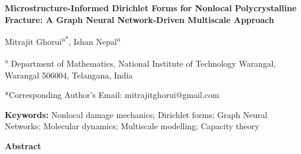 \documentclass[12pt,a4paper]{article}
\newcommand{\NMAMLDTitle}[1]{%
  {\centering\fontsize{14}{16.8}\selectfont\bfseries #1\par}%
}
\newcommand{\NMAMLDAuthors}[1]{%
  {\centering\fontsize{12}{14.4}\selectfont #1\par}%
}
\newcommand{\NMAMLDAffiliation}[2]{%
  {\centering\fontsize{10}{12}\selectfont\textsuperscript{#1} #2\par}%
  \vspace{6pt}
}
\newcommand{\NMAMLDSection}[1]{%
  {\fontsize{12}{14.4}\selectfont\bfseries #1\par}%
}
\begin{document}
\thispagestyle{nmamldfirst}

\NMAMLDTitle{Microstructure-Informed Dirichlet Forms for Nonlocal Polycrystalline Fracture: A Graph Neural Network-Driven Multiscale Approach}

\vspace{4pt}

\NMAMLDAuthors{%
Mitrajit Ghorui\textsuperscript{a*},
Ishan Nepal\textsuperscript{a}
}

\vspace{4pt}

\NMAMLDAffiliation{a}{Department of Mathematics, National Institute of Technology Warangal, Warangal 506004, Telangana, India}

{\fontsize{12}{14.4}\selectfont
*Corresponding Author's Email: mitrajitghorui@gmail.com\par
}

\vspace{6pt}

{\fontsize{12}{14.4}\selectfont
\justifying
\textbf{Keywords:} Nonlocal damage mechanics; Dirichlet forms; Graph Neural Networks; Molecular dynamics; Multiscale modelling; Capacity theory\par
}

\vspace{6pt}

\NMAMLDSection{Abstract}

\vspace{6pt}
\end{document}
